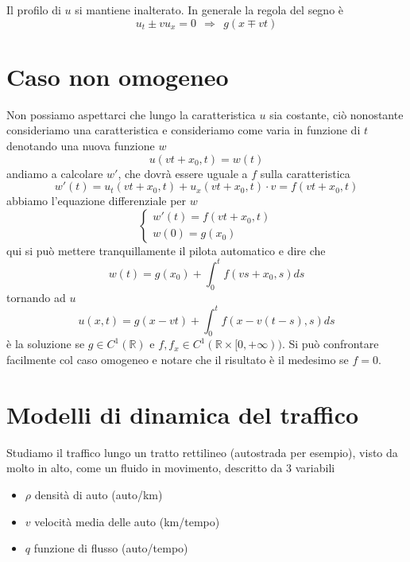 \documentclass[10pt,a4paper,twoside,openright]{book}
\begin{document}

Il profilo di $u$ si mantiene inalterato. In generale la regola del segno è
\begin{equation*}
	u_{t} \pm vu_{x} =0\ \ \Rightarrow \ \ g( x\mp vt)
\end{equation*}
\section{Caso non omogeneo}

Non possiamo aspettarci che lungo la caratteristica $u$ sia costante, ciò nonostante consideriamo una caratteristica e consideriamo come varia in funzione di $t$ denotando una nuova funzione $w$
\begin{equation*}
	u( vt+x_{0} ,t) =w( t)
\end{equation*}
andiamo a calcolare $w'$, che dovrà essere uguale a $f$ sulla caratteristica
\begin{equation*}
	w'( t) =u_{t}( vt+x_{0} ,t) +u_{x}( vt+x_{0} ,t) \cdotp v=f( vt+x_{0} ,t)
\end{equation*}
abbiamo l'equazione differenziale per $w$
\begin{equation*}
	\begin{cases}
		w'( t) =f( vt+x_{0} ,t) \\
		w( 0) =g( x_{0})        
	\end{cases}
\end{equation*}
qui si può mettere tranquillamente il pilota automatico e dire che
\begin{equation*}
	w( t) =g( x_{0}) +\int ^{t}_{0} f( vs+x_{0} ,s) ds
\end{equation*}
tornando ad $u$
\begin{equation}
	u( x,t) =g( x-vt) +\int ^{t}_{0} f( x-v( t-s) ,s) ds
\end{equation}
è la soluzione se $g\in C^{1}(\mathbb{R})$ e $f,f_{x} \in C^{1}(\mathbb{R} \times [ 0,+\infty ))$. Si può confrontare facilmente col caso omogeneo e notare che il risultato è il medesimo se $f=0$.

\section{Modelli di dinamica del traffico}

Studiamo il traffico lungo un tratto rettilineo (autostrada per esempio), visto da molto in alto, come un fluido in movimento, descritto da $3$ variabili
\begin{itemize}
	\item $\rho $ densità di auto (auto/km)
	\item $v$ velocità media delle auto (km/tempo)
	\item $q$ funzione di flusso (auto/tempo)
\end{itemize}
\end{document}
